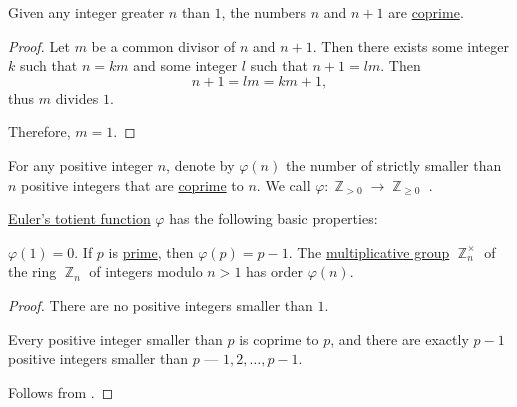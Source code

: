 \begin{proposition}\label{thm:n_plus_1_coprime}
  Given any integer greater \( n \) than \( 1 \), the numbers \( n \) and \( n + 1 \) are \hyperref[def:coprime_elements]{coprime}.
\end{proposition}
\begin{proof}
  Let \( m \) be a common divisor of \( n \) and \( n + 1 \). Then there exists some integer \( k \) such that \( n = km \) and some integer \( l \) such that \( n + 1 = lm \). Then
  \begin{equation*}
    n + 1 = lm = km + 1,
  \end{equation*}
  thus \( m \) divides \( 1 \).

  Therefore, \( m = 1 \).
\end{proof}

\begin{definition}\label{def:eulers_totient_function}
  For any positive integer \( n \), denote by \( \varphi(n) \) the number of strictly smaller than \( n \) positive integers that are \hyperref[def:coprime_elements]{coprime} to \( n \). We call \( \varphi: \BbbZ_{>0} \to \BbbZ_{\geq 0} \) .
\end{definition}

\begin{proposition}\label{thm:def:eulers_totient_function}
  \hyperref[def:eulers_totient_function]{Euler's totient function} \( \varphi \) has the following basic properties:
  \begin{thmenum}
     \( \varphi(1) = 0 \).
     If \( p \) is \hyperref[def:prime_number]{prime}, then \( \varphi(p) = p - 1 \).
     The \hyperref[def:semiring]{multiplicative group} \( \BbbZ_n^\times \) of the ring \hyperref[thm:ring_of_integers_modulo]{\( \BbbZ_n \)} of integers modulo \( n > 1 \) has order \( \varphi(n) \).
  \end{thmenum}
\end{proposition}
\begin{proof}
   There are no positive integers smaller than \( 1 \).

   Every positive integer smaller than \( p \) is coprime to \( p \), and there are exactly \( p - 1 \) positive integers smaller than \( p \) --- \( 1, 2, \ldots, p - 1 \).

   Follows from .
\end{proof}

